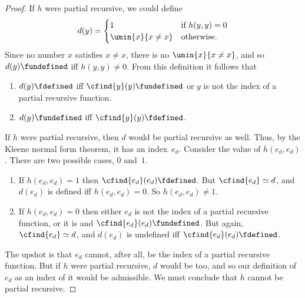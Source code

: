 \documentclass[../../../include/open-logic-section]{subfiles}
\begin{document}
\begin{proof}
If $h$
were partial recursive, we could define
\[
d(y) =
\begin{cases}
1 & \text{if $h(y, y) = 0$}\\
\umin{x}{x \neq x} & \text{otherwise.}
\end{cases}
\]
Since no number $x$ satisfies $x \neq x$, there is no $\umin{x}{x \neq
x}$, and so $d(y) \fundefined$ iff $h(y,y) \neq 0$. From this
definition it follows that
\begin{enumerate}
\item $d(y) \fdefined$ iff $\cfind{y}(y) \fundefined$ or $y$ is
  not the index of a partial recursive function.
\item $d(y) \fundefined$ iff $\cfind{y}(y) \fdefined$.
\end{enumerate}
If $h$ were partial recursive, then $d$ would be partial recursive as
well.  Thus, by the Kleene normal form theorem, it has an index~$e_d$.
Consider the value of $h(e_d, e_d)$. There are two possible cases, $0$
and~$1$.
\begin{enumerate}
\item If $h(e_d, e_d) = 1$ then $\cfind{e_d}(e_d) \fdefined$.  But
  $\cfind{e_d} \simeq d$, and $d(e_d)$ is defined iff $h(e_d, e_d) = 0$.
  So $h(e_d, e_d) \neq 1$.
\item If $h(e_d, e_d) = 0$ then either $e_d$ is not the index of a
  partial recursive function, or it is and $\cfind{e_d}(e_d)
  \fundefined$. But again, $\cfind{e_d} \simeq d$, and $d(e_d)$ is undefined
  iff $\cfind{e_d}(e_d) \fdefined$.
\end{enumerate}
The upshot is that $e_d$ cannot, after all, be the index of a partial
recursive function.  But if $h$ were partial recursive, $d$ would be
too, and so our definition of $e_d$ as an index of it would be
admissible.  We must conclude that $h$ cannot be partial recursive.
\end{proof}
\end{document}
